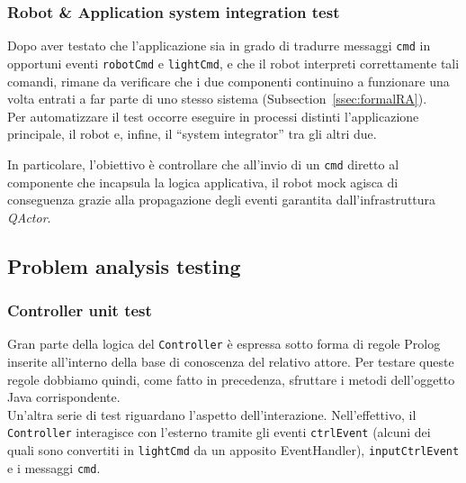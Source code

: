 \documentclass{../llncs}
\newcommand{\codescript}[1]{{\mbox{\small{\texttt{#1}}}}\xspace}
\newcommand{\qa}{\textsf{\textit{QActor}}\xspace}
\newcommand{\xss}[1]{\subsectionname~\ref{ssec:#1}}
\newcommand{\subsectionname}{Subsection}
\begin{document}


\subsubsection{Robot \& Application system integration test}
Dopo aver testato che l'applicazione sia in grado di tradurre messaggi \codescript{cmd} in opportuni eventi \codescript{robotCmd} e \codescript{lightCmd}, e che il robot interpreti correttamente tali comandi, rimane da verificare che i due componenti continuino a funzionare una volta entrati a far parte di uno stesso sistema (\xss{formalRA}).\\

Per automatizzare il test occorre eseguire in processi distinti l'applicazione principale, il robot e, infine,
il ``system integrator'' tra gli altri due.

In particolare, l'obiettivo è controllare che all'invio di un \codescript{cmd} diretto al componente che incapsula la logica applicativa, il robot mock agisca di conseguenza grazie alla propagazione degli eventi garantita dall'infrastruttura {\qa}.\\



\subsection{Problem analysis testing}

\subsubsection{Controller unit test}
Gran parte della logica del \texttt{Controller} è espressa sotto forma di regole Prolog inserite all'interno della base di conoscenza del relativo attore. Per testare queste regole dobbiamo quindi, come fatto in precedenza, sfruttare i metodi dell'oggetto Java corrispondente.\\



Un'altra serie di test riguardano l'aspetto dell'interazione. Nell'effettivo, il \texttt{Controller} interagisce con l'esterno tramite gli eventi \codescript{ctrlEvent} (alcuni dei quali sono convertiti in \codescript{lightCmd} da un apposito EventHandler), \codescript{inputCtrlEvent} e i messaggi \codescript{cmd}.\\
\end{document}
